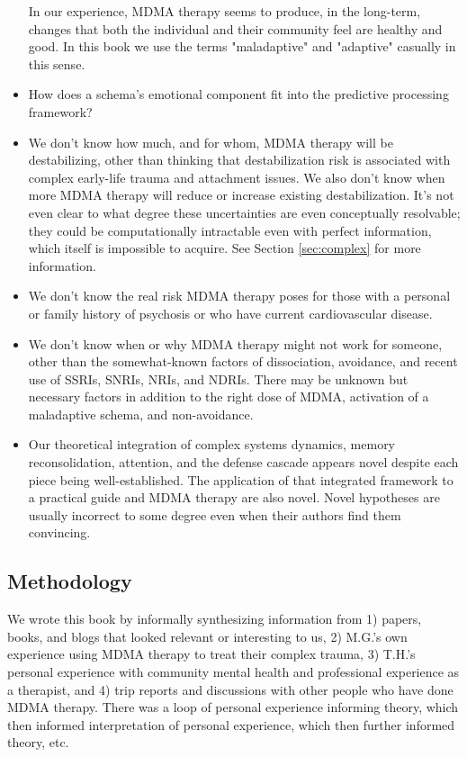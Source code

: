 \documentclass[12pt,letterpaper]{book}
\begin{document}
\begin{itemize}
    In our experience, MDMA therapy seems to produce, in the long-term, changes that both the individual and their community feel are healthy and good. In this book we use the terms "maladaptive" and "adaptive" casually in this sense.
    \item How does a schema's emotional component fit into the predictive processing framework?
    \item We don't know how much, and for whom, MDMA therapy will be destabilizing, other than thinking that destabilization risk is associated with complex early-life trauma and attachment issues. We also don't know when more MDMA therapy will reduce or increase existing destabilization. It's not even clear to what degree these uncertainties are even conceptually resolvable; they could be computationally intractable even with perfect information, which itself is impossible to acquire. See Section \ref{sec:complex} for more information.
    \item We don't know the real risk MDMA therapy poses for those with a personal or family history of psychosis or who have current cardiovascular disease.
    \item We don't know when or why MDMA therapy might not work for someone, other than the somewhat-known factors of dissociation, avoidance, and recent use of SSRIs, SNRIs, NRIs, and NDRIs. There may be unknown but necessary factors in addition to the right dose of MDMA, activation of a maladaptive schema, and non-avoidance.
    \item Our theoretical integration of complex systems dynamics, memory reconsolidation, attention, and the defense cascade appears novel despite each piece being well-established. The application of that integrated framework to a practical guide and MDMA therapy are also novel. Novel hypotheses are usually incorrect to some degree even when their authors find them convincing.
\end{itemize}

\subsection*{Methodology}
We wrote this book by informally synthesizing information from 1) papers, books, and blogs that looked relevant or interesting to us, 2) M.G.'s own experience using MDMA therapy to treat their complex trauma, 3) T.H.'s personal experience with community mental health and professional experience as a therapist, and 4) trip reports and discussions with other people who have done MDMA therapy. There was a loop of personal experience informing theory, which then informed interpretation of personal experience, which then further informed theory, etc.
\end{document}

